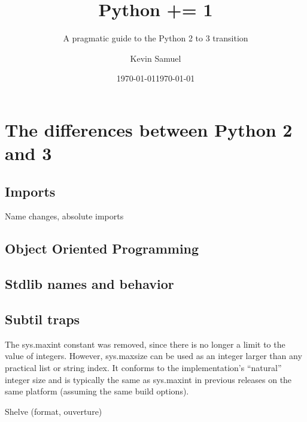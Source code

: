 \documentclass[paperwidth=8in, paperheight=10in,lang=en]{elegantbook}
\title{Python += 1}
\subtitle{A pragmatic guide to the Python 2 to 3 transition}
\institute{Bite Code}
\date{\today}
\author{Kevin Samuel}
\date{\today}
\begin{document}
\maketitle

\frontmatter

\tableofcontents



\mainmatter

\hypersetup{pageanchor=true}

\part{The differences between Python 2 and 3}









\chapter{Imports}

Name changes, absolute imports


\chapter{Object Oriented Programming}\label{chap:oop}

\chapter{Stdlib names and behavior}

\chapter{Subtil traps}

The sys.maxint constant was removed, since there is no longer a limit to the value of integers. However, sys.maxsize can be used as an integer larger than any practical list or string index. It conforms to the implementation’s “natural” integer size and is typically the same as sys.maxint in previous releases on the same platform (assuming the same build options).

Shelve (format, ouverture)
\end{document}
